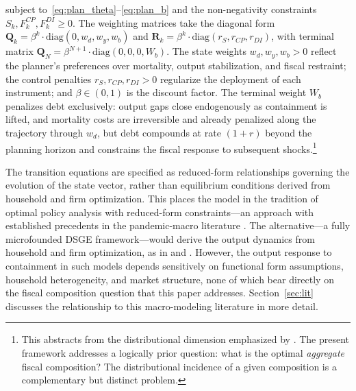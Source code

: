 \documentclass[12pt, a4paper]{article}
\begin{document}
%
%

subject to~\eqref{eq:plan_theta}--\eqref{eq:plan_b} and the non-negativity constraints $S_k, F^{CP}_k, F^{DI}_k \geq 0$. The weighting matrices take the diagonal form $\bm{Q}_k = \beta^k \cdot \text{diag}(0, w_d, w_y, w_b)$ and $\bm{R}_k = \beta^k \cdot \text{diag}(r_S, r_{CP}, r_{DI})$, with terminal matrix $\bm{Q}_N = \beta^{N+1} \cdot \text{diag}(0, 0, 0, W_b)$. The state weights $w_d, w_y, w_b > 0$ reflect the planner's preferences over mortality, output stabilization, and fiscal restraint; the control penalties $r_S, r_{CP}, r_{DI} > 0$ regularize the deployment of each instrument; and $\beta \in (0,1)$ is the discount factor. The terminal weight $W_b$ penalizes debt exclusively: output gaps close endogenously as containment is lifted, and mortality costs are irreversible and already penalized along the trajectory through $w_d$, but debt compounds at rate $(1+r)$ beyond the planning horizon and constrains the fiscal response to subsequent shocks.\footnote{This abstracts from the distributional dimension emphasized by \citet{KaplanMollViolante2020}. The present framework addresses a logically prior question: what is the optimal \textit{aggregate} fiscal composition? The distributional incidence of a given composition is a complementary but distinct problem.}

The transition equations are specified as reduced-form relationships governing the evolution of the state vector, rather than equilibrium conditions derived from household and firm optimization. This places the model in the tradition of optimal policy analysis with reduced-form constraints---an approach with established precedents in the pandemic-macro literature \citep{alvarez2020, acemoglu2021}. The alternative---a fully microfounded DSGE framework---would derive the output dynamics from household and firm optimization, as in \citet{eichenbaum2021macro} and \citet{KaplanMollViolante2020}. However, the output response to containment in such models depends sensitively on functional form assumptions, household heterogeneity, and market structure, none of which bear directly on the fiscal composition question that this paper addresses. Section~\ref{sec:lit} discusses the relationship to this macro-modeling literature in more detail.
\end{document}
